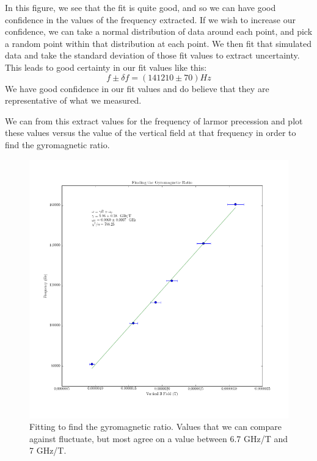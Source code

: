 \documentclass{article}
\begin{document}
    In this figure, we see that the fit is quite good, and so we can have good confidence in the values of the frequency extracted.  If we wish to increase our confidence, we can take a normal distribution of data around each point, and pick a random point within that distribution at each point.  We then fit that simulated data and take the standard deviation of those fit values to extract uncertainty.  This leads to good certainty in our fit values like this:
    \begin{equation}
      f \pm \delta f = (141210 \pm 70) Hz
      \label{freq_sample}
    \end{equation}
    We have good confidence in our fit values and do believe that they are representative of what we measured.

    We can from this extract values for the frequency of larmor precession and plot these values versus the value of the vertical field at that frequency in order to find the gyromagnetic ratio.

    \begin{figure}[!htb]
      \centering
      \includegraphics[scale=.5]{../plots/gyromagnetic_ratio_fit.png}
      \caption{Fitting to find the gyromagnetic ratio.  Values that we can compare against fluctuate, but most agree on a value between 6.7 GHz/T and 7 GHz/T.}
      \label{gyromagnetic}
    \end{figure}
\end{document}
